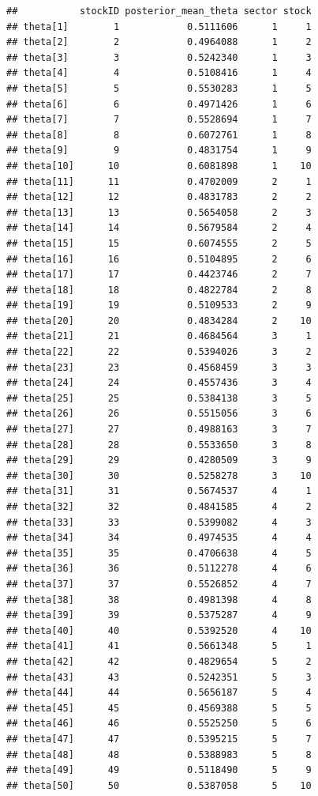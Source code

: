 \documentclass[
  11pt,
]{article}
\begin{document}
\begin{verbatim}
##           stockID posterior_mean_theta sector stock
## theta[1]        1            0.5111606      1     1
## theta[2]        2            0.4964088      1     2
## theta[3]        3            0.5242340      1     3
## theta[4]        4            0.5108416      1     4
## theta[5]        5            0.5530283      1     5
## theta[6]        6            0.4971426      1     6
## theta[7]        7            0.5528694      1     7
## theta[8]        8            0.6072761      1     8
## theta[9]        9            0.4831754      1     9
## theta[10]      10            0.6081898      1    10
## theta[11]      11            0.4702009      2     1
## theta[12]      12            0.4831783      2     2
## theta[13]      13            0.5654058      2     3
## theta[14]      14            0.5679584      2     4
## theta[15]      15            0.6074555      2     5
## theta[16]      16            0.5104895      2     6
## theta[17]      17            0.4423746      2     7
## theta[18]      18            0.4822784      2     8
## theta[19]      19            0.5109533      2     9
## theta[20]      20            0.4834284      2    10
## theta[21]      21            0.4684564      3     1
## theta[22]      22            0.5394026      3     2
## theta[23]      23            0.4568459      3     3
## theta[24]      24            0.4557436      3     4
## theta[25]      25            0.5384138      3     5
## theta[26]      26            0.5515056      3     6
## theta[27]      27            0.4988163      3     7
## theta[28]      28            0.5533650      3     8
## theta[29]      29            0.4280509      3     9
## theta[30]      30            0.5258278      3    10
## theta[31]      31            0.5674537      4     1
## theta[32]      32            0.4841585      4     2
## theta[33]      33            0.5399082      4     3
## theta[34]      34            0.4974535      4     4
## theta[35]      35            0.4706638      4     5
## theta[36]      36            0.5112278      4     6
## theta[37]      37            0.5526852      4     7
## theta[38]      38            0.4981398      4     8
## theta[39]      39            0.5375287      4     9
## theta[40]      40            0.5392520      4    10
## theta[41]      41            0.5661348      5     1
## theta[42]      42            0.4829654      5     2
## theta[43]      43            0.5242351      5     3
## theta[44]      44            0.5656187      5     4
## theta[45]      45            0.4569388      5     5
## theta[46]      46            0.5525250      5     6
## theta[47]      47            0.5395215      5     7
## theta[48]      48            0.5388983      5     8
## theta[49]      49            0.5118490      5     9
## theta[50]      50            0.5387058      5    10
\end{verbatim}
\end{document}
